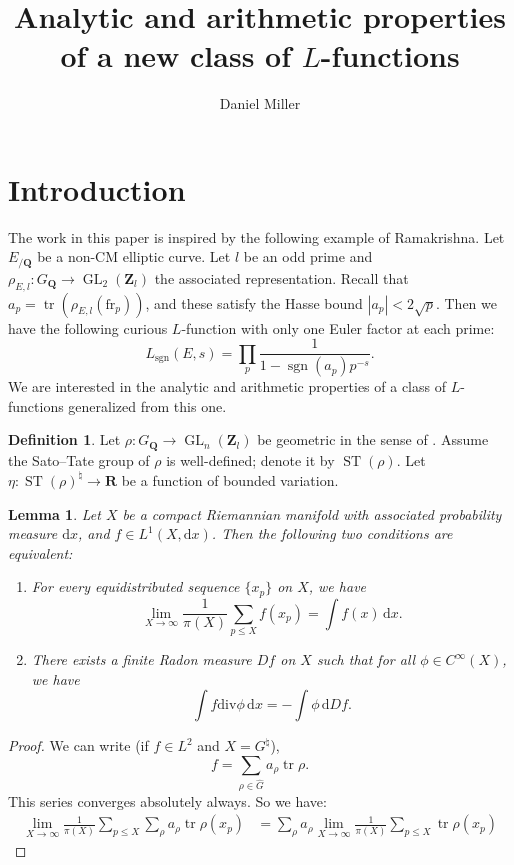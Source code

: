 \documentclass{article}
\title{Analytic and arithmetic properties of a new class of \texorpdfstring{$L$}{L}-functions}
\author{Daniel Miller}
\DeclareMathOperator{\GL}{GL}
\DeclareMathOperator{\sgn}{sgn}
\DeclareMathOperator{\ST}{ST}
\DeclareMathOperator{\tr}{tr}
\newcommand{\bQ}{\mathbf{Q}}
\newcommand{\bR}{\mathbf{R}}
\newcommand{\bZ}{\mathbf{Z}}
\newcommand{\dd}{\mathrm{d}}
\newcommand{\ddiv}{\mathrm{div}}
\newcommand{\fr}{\mathrm{fr}}
\newtheorem{lemma}[theorem]{Lemma}
\theoremstyle{definition}
\newtheorem{definition}[theorem]{Definition}
\numberwithin{theorem}{section}
\begin{document}
\maketitle





\section{Introduction}

The work in this paper is inspired by the following example of Ramakrishna. Let 
$E_{/\bQ}$ be a non-CM elliptic curve. Let $l$ be an odd prime and 
$\rho_{E,l}\colon G_\bQ \to \GL_2(\bZ_l)$ the associated representation. Recall 
that $a_p = \tr(\rho_{E,l}(\fr_p))$, and these satisfy the Hasse bound 
$|a_p|<2\sqrt p$. Then we have the following curious $L$-function with only one 
Euler factor at each prime: 
\[
	L_{\sgn}(E,s) = \prod_p \frac{1}{1-\sgn(a_p) p^{-s}} .
\]
We are interested in the analytic and arithmetic properties of a class of 
$L$-functions generalized from this one. 

\begin{definition}
Let $\rho\colon G_\bQ \to \GL_n(\bZ_l)$ be geometric in the sense of 
\cite{fontain-mazur-1995}. Assume the Sato--Tate group of $\rho$ is 
well-defined; denote it by $\ST(\rho)$. Let 
$\eta\colon \ST(\rho)^\natural \to \bR$ be a function of bounded variation.  
\end{definition}





\begin{lemma}
Let $X$ be a compact Riemannian manifold with associated probability measure 
$\dd x$, and $f\in L^1(X, \dd x)$. Then the following two conditions are 
equivalent:
\begin{enumerate}
\item
For every equidistributed sequence $\{x_p\}$ on $X$, we have 
\[
	\lim_{X\to \infty} \frac{1}{\pi(X)} \sum_{p\leqslant X} f(x_p) = \int f(x)\, \dd x .
\]
\item
There exists a finite Radon measure $D f$ on $X$ such that for all 
$\phi\in C^\infty(X)$, we have 
\[
	\int f\ddiv \phi\, \dd x = -\int \phi\, \dd Df .
\]
\end{enumerate}
\end{lemma}
\begin{proof}
We can write (if $f\in L^2$ and $X=G^\natural$), 
\[
	f = \sum_{\rho\in \widehat G} a_\rho \tr \rho .
\]
This series converges absolutely always. So we have:
\begin{align*}
	\lim_{X\to \infty} \frac{1}{\pi(X)} \sum_{p\leqslant X} \sum_\rho a_\rho \tr \rho(x_p)
		&= \sum_\rho a_\rho \lim_{X\to \infty} \frac{1}{\pi(X)}\sum_{p\leqslant X} \tr \rho(x_p)
\end{align*}
\end{proof}
\end{document}
